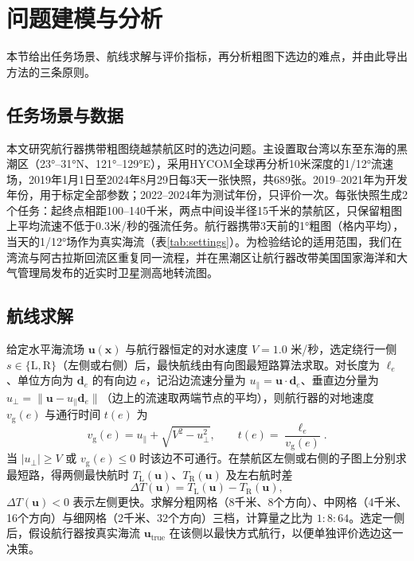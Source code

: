 \section{问题建模与分析}
\label{sec:problem}

本节给出任务场景、航线求解与评价指标，再分析粗图下选边的难点，并由此导出方法的三条原则。

\subsection{任务场景与数据}
本文研究航行器携带粗图绕越禁航区时的选边问题。主设置取台湾以东至东海的黑潮区（23°--31°N、121°--129°E），采用HYCOM全球再分析10米深度的1/12°流速场\cite{chassignet2007hycom}，2019年1月1日至2024年8月29日每3天一张快照，共689张。2019--2021年为开发年份，用于标定全部参数；2022--2024年为测试年份，只评价一次。每张快照生成2个任务：起终点相距100--140千米，两点中间设半径15千米的禁航区，只保留粗图上平均流速不低于0.3米/秒的强流任务。航行器携带3天前的1°粗图（格内平均），当天的1/12°场作为真实海流（表\ref{tab:settings}）。为检验结论的适用范围，我们在湾流与阿古拉斯回流区重复同一流程，并在黑潮区让航行器改带美国国家海洋和大气管理局发布的近实时卫星测高地转流图。

\begin{table}[tb]
\centering
\caption{黑潮主设置的实验设置与参数（其余设置只换海区或粗图来源，参数各自在开发年份标定）。}
\label{tab:settings}
\small

\end{table}

\subsection{航线求解}
给定水平海流场 $\boldsymbol{u}(\boldsymbol{x})$ 与航行器恒定的对水速度 $V = 1.0$ 米/秒，选定绕行一侧 $s \in \{\text{L}, \text{R}\}$（左侧或右侧）后，最快航线由有向图最短路算法求取\cite{dijkstra1959note}。对长度为 $\ell_e$、单位方向为 $\boldsymbol{d}_e$ 的有向边 $e$，记沿边流速分量为 $u_{\parallel} = \boldsymbol{u} \cdot \boldsymbol{d}_e$、垂直边分量为 $u_{\perp} = \|\boldsymbol{u} - u_{\parallel}\boldsymbol{d}_e\|$（边上的流速取两端节点的平均），则航行器的对地速度 $v_{\text{g}}(e)$ 与通行时间 $t(e)$ 为
\begin{equation}
v_{\text{g}}(e) = u_{\parallel} + \sqrt{V^2 - u_{\perp}^2}, \qquad t(e) = \frac{\ell_e}{v_{\text{g}}(e)}.
\label{eq:edge_time}
\end{equation}
当 $|u_{\perp}| \ge V$ 或 $v_{\text{g}}(e) \le 0$ 时该边不可通行。在禁航区左侧或右侧的子图上分别求最短路，得两侧最快航时 $T_{\text{L}}(\boldsymbol{u})$、$T_{\text{R}}(\boldsymbol{u})$ 及左右航时差
\begin{equation}
\Delta T(\boldsymbol{u}) = T_{\text{L}}(\boldsymbol{u}) - T_{\text{R}}(\boldsymbol{u}),
\label{eq:delta_t}
\end{equation}
$\Delta T(\boldsymbol{u}) < 0$ 表示左侧更快。求解分粗网格（8千米、8个方向）、中网格（4千米、16个方向）与细网格（2千米、32个方向）三档，计算量之比为 $1:8:64$。选定一侧后，假设航行器按真实海流 $\boldsymbol{u}_{\text{true}}$ 在该侧以最快方式航行，以便单独评价选边这一决策。

